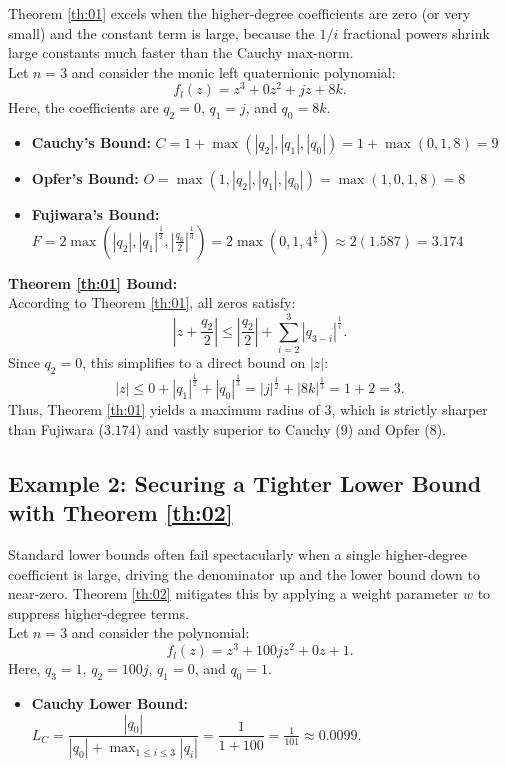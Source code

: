 \documentclass [12pt]{article}
\begin{document}
Theorem \ref{th:01} excels when the higher-degree coefficients are zero (or very small) and the constant term is large, because the $1/i$ fractional powers shrink large constants much faster than the Cauchy max-norm.\\
Let $n=3$ and consider the monic left quaternionic polynomial:
\[ f_{l}(z) = z^{3} + 0z^{2} + jz + 8k. \]
Here, the coefficients are $q_2 = 0$, $q_1 = j$, and $q_0 = 8k$.
\begin{itemize}
	\item \textbf{Cauchy's Bound:} $C = 1 + \max(|q_2|, |q_1|, |q_0|) = 1 + \max(0, 1, 8) = 9$
	\item \textbf{Opfer's Bound:} $O=\max(1, |q_2|, |q_1|, |q_0|)=\max(1,0,1,8)=8$
	\item \textbf{Fujiwara's Bound:} $F = 2 \max\left(|q_2|, |q_1|^{\frac{1}{2}}, \left|\frac{q_0}{2}\right|^{\frac{1}{3}}\right) = 2 \max\left(0, 1, 4^{\frac{1}{3}}\right) \approx 2(1.587) = 3.174$
\end{itemize}
\vspace{0.3cm}
\noindent \textbf{Theorem \ref{th:01} Bound:}\\
According to Theorem \ref{th:01}, all zeros satisfy:
\[ \left|z+\frac{q_{2}}{2}\right| \le \left|\frac{q_{2}}{2}\right| + \sum\limits_{i=2}^{3}|q_{3-i}|^{\frac{1}{i}}. \]
Since $q_2 = 0$, this simplifies to a direct bound on $|z|$:
\[ |z| \le 0 + |q_{1}|^{\frac{1}{2}} + |q_{0}|^{\frac{1}{3}} =|j|^{\frac{1}{2}} + |8k|^{\frac{1}{3}} = 1 + 2 = 3. \]
Thus, Theorem \ref{th:01} yields a maximum radius of \textbf{$3$}, which is strictly sharper than Fujiwara ($3.174$) and vastly superior to Cauchy ($9$) and Opfer ($8$).
\subsection*{Example 2: Securing a Tighter Lower Bound with Theorem \ref{th:02}}

Standard lower bounds often fail spectacularly when a single higher-degree coefficient is large, driving the denominator up and the lower bound down to near-zero. Theorem \ref{th:02} mitigates this by applying a weight parameter $w$ to suppress higher-degree terms.\\
Let $n=3$ and consider the polynomial:
\[ f_{l}(z) = z^{3} + 100jz^{2} + 0z + 1. \]
Here, $q_3 = 1$, $q_2 = 100j$, $q_1 = 0$, and $q_0 = 1$.
\begin{itemize}
	\item \textbf{Cauchy Lower Bound:} $L_{C} = \dfrac{|q_0|}{|q_0| + \max_{1 \le i \le 3}|q_i|} = \dfrac{1}{1 + 100} = \frac{1}{101} \approx 0.0099.$
\end{itemize}
\end{document}
